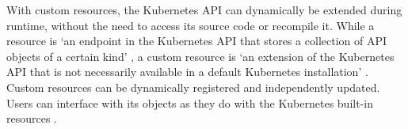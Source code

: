 With custom resources, the Kubernetes API can dynamically be extended during runtime,
without the need to access its source code or recompile it.
While a resource is
\enquote*{an endpoint in the Kubernetes API that stores a collection of API objects of a certain kind}
\autocite{customResourcesKubernetesIO},
a custom resource is
\enquote*{an extension of the Kubernetes API that is not necessarily available in a default Kubernetes installation}
\autocite{customResourcesKubernetesIO}.
Custom resources can be dynamically registered and independently updated.
Users can interface with its objects as they do with the Kubernetes built-in resources
\autocite{customResourcesKubernetesIO}.















